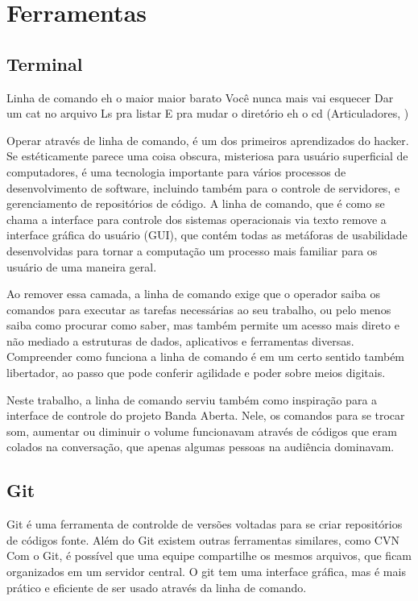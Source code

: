 \section{Ferramentas}
\subsection{Terminal}

\begin{citacao}
Linha de comando eh o maior maior barato
Você nunca mais vai esquecer
Dar um cat no arquivo
Ls pra listar
E pra mudar o diretório eh o cd (Articuladores, )
\end{citacao}

Operar através de linha de comando, é um dos primeiros aprendizados do hacker. Se estéticamente parece uma coisa obscura, misteriosa para usuário superficial de computadores, é uma tecnologia importante para vários processos de desenvolvimento de software, incluindo também para o controle de servidores, e gerenciamento de repositórios de código. A linha de comando, que é como se chama a interface para controle dos sistemas operacionais via texto remove a interface gráfica do usuário (GUI), que contém todas as metáforas de usabilidade desenvolvidas para tornar a computação um processo mais familiar para os usuário de uma maneira geral.

Ao remover essa camada, a linha de comando exige que o operador saiba os comandos para executar as tarefas necessárias ao seu trabalho, ou pelo menos saiba como procurar como saber, mas também permite um acesso mais direto e não mediado a estruturas de dados, aplicativos e ferramentas diversas. Compreender como funciona a linha de comando é em um certo sentido também libertador, ao passo que pode conferir agilidade e poder sobre meios digitais. 

Neste trabalho, a linha de comando serviu também como inspiração para a interface de controle do projeto Banda Aberta. Nele, os comandos para se trocar som, aumentar ou diminuir o volume funcionavam através de códigos que eram colados na conversação, que apenas algumas pessoas na audiência dominavam. 


\subsection{Git}
Git é uma ferramenta de controlde de versões voltadas para se criar repositórios de códigos fonte. Além do Git existem outras ferramentas similares, como CVN Com o Git, é possível que uma equipe compartilhe os mesmos arquivos, que ficam organizados em um servidor central. O git tem uma interface gráfica, mas é mais prático e eficiente de ser usado através da linha de comando. 

